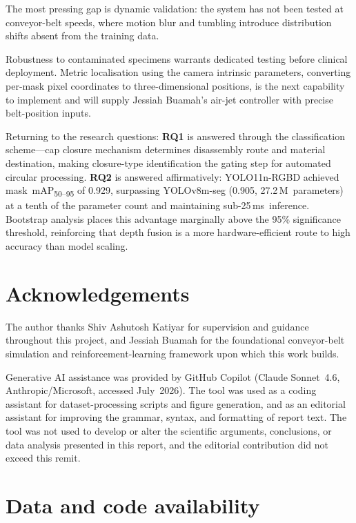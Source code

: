 \documentclass{Academic}
\begin{document}
The most pressing gap is dynamic validation: the system has not been tested at conveyor-belt speeds, where motion blur and tumbling introduce distribution shifts absent from the training data.

Robustness to contaminated specimens warrants dedicated testing before clinical deployment. Metric localisation using the camera intrinsic parameters, converting per-mask pixel coordinates to three-dimensional positions, is the next capability to implement and will supply Jessiah Buamah's air-jet controller with precise belt-position inputs.

Returning to the research questions: \textbf{RQ1} is answered through the classification scheme---cap closure mechanism determines disassembly route and material destination, making closure-type identification the gating step for automated circular processing. \textbf{RQ2} is answered affirmatively: YOLO11n-RGBD achieved mask~mAP\textsubscript{50--95} of 0.929, surpassing YOLOv8m-seg (0.905, 27.2\,M~parameters) at a tenth of the parameter count and maintaining sub-25\,ms~inference. Bootstrap analysis places this advantage marginally above the 95\% significance threshold, reinforcing that depth fusion is a more hardware-efficient route to high accuracy than model scaling.

\section*{Acknowledgements}

The author thanks Shiv Ashutosh Katiyar for supervision and guidance throughout this project, and Jessiah Buamah for the foundational conveyor-belt simulation and reinforcement-learning framework upon which this work builds.

Generative AI assistance was provided by GitHub Copilot (Claude Sonnet~4.6, Anthropic/Microsoft, accessed July~2026). The tool was used as a coding assistant for dataset-processing scripts and figure generation, and as an editorial assistant for improving the grammar, syntax, and formatting of report text. The tool was not used to develop or alter the scientific arguments, conclusions, or data analysis presented in this report, and the editorial contribution did not exceed this remit.

\section*{Data and code availability}
\end{document}
